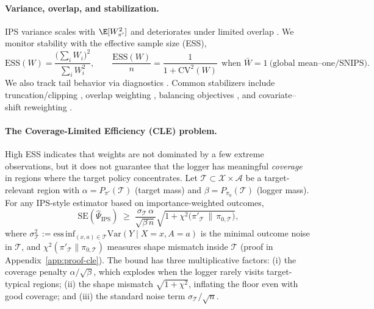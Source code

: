 \paragraph{Variance, overlap, and stabilization.}
IPS variance scales with $\E[W_{\pi'}^{2}]$ and deteriorates under limited overlap
\citep{Crump2009LimitedOverlap}. We monitor stability with the effective sample size (ESS),
\[
\mathrm{ESS}(W)=\frac{\big(\sum_i W_i\big)^2}{\sum_i W_i^2},
\qquad
\frac{\mathrm{ESS}(W)}{n}=\frac{1}{1+\mathrm{CV}^2(W)}\ \ \text{when } \bar W=1\ \text{(global mean–one/SNIPS)}.
\]
We also track tail behavior via diagnostics \citep{Hill1975TailIndex,Liu2001MC,Owen2013MCTME}.
Common stabilizers include truncation/clipping \citep{Ionides2008TruncatedIS}, overlap weighting
\citep{LiMorganZaslavsky2018}, balancing objectives
\citep{Kallus2018Balanced}, and covariate–shift reweighting
\citep{Shimodaira2000CovShift,SugiyamaKrauledatMueller2007IWCV}.

\paragraph{The Coverage-Limited Efficiency (CLE) problem.}
High ESS indicates that weights are not dominated by a few extreme observations, but it does not guarantee that the logger has meaningful \emph{coverage} in regions where the target policy concentrates.
Let $\mathcal{T} \subset \mathcal{X} \times \mathcal{A}$ be a target-relevant region with $\alpha = P_{\pi'}(\mathcal{T})$ (target mass) and $\beta = P_{\pi_0}(\mathcal{T})$ (logger mass). For any IPS-style estimator based on importance-weighted outcomes,
\begin{equation}
\label{eq:cle-bound}
\mathrm{SE}(\hat\Psi_{\mathrm{IPS}}) \;\ge\; \frac{\sigma_{\mathcal{T}} \,\alpha}{\sqrt{\beta\, n}} \sqrt{1 + \chi^2\!\big(\pi'_{\mathcal{T}} \,\|\, \pi_{0,\mathcal{T}}\big)},
\end{equation}
where $\sigma_{\mathcal{T}}^2 := \mathrm{ess\,inf}_{(x,a)\in \mathcal{T}} \mathrm{Var}(Y \mid X{=}x, A{=}a)$ is the minimal outcome noise in $\mathcal{T}$, and $\chi^2(\pi'_{\mathcal{T}} \| \pi_{0,\mathcal{T}})$ measures shape mismatch inside $\mathcal{T}$ (proof in Appendix~\ref{app:proof-cle}).
The bound has three multiplicative factors: (i) the coverage penalty $\alpha/\sqrt{\beta}$, which explodes when the logger rarely visits target-typical regions; (ii) the shape mismatch $\sqrt{1+\chi^2}$, inflating the floor even with good coverage; and (iii) the standard noise term $\sigma_{\mathcal{T}}/\sqrt{n}$.

